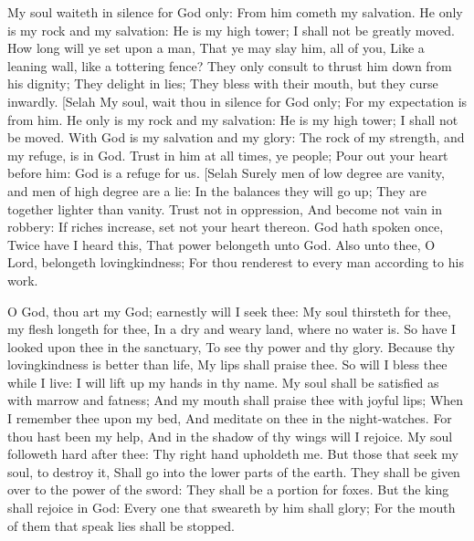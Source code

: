 My soul waiteth in silence for God only: From him cometh my salvation.  He only is my rock and my salvation: He is my high tower; I shall not be greatly moved.  How long will ye set upon a man, That ye may slay him, all of you, Like a leaning wall, like a tottering fence?  They only consult to thrust him down from his dignity; They delight in lies; They bless with their mouth, but they curse inwardly. [Selah  My soul, wait thou in silence for God only; For my expectation is from him.  He only is my rock and my salvation: He is my high tower; I shall not be moved.  With God is my salvation and my glory: The rock of my strength, and my refuge, is in God.  Trust in him at all times, ye people; Pour out your heart before him: God is a refuge for us. [Selah  Surely men of low degree are vanity, and men of high degree are a lie: In the balances they will go up; They are together lighter than vanity.  Trust not in oppression, And become not vain in robbery: If riches increase, set not your heart thereon.  God hath spoken once, Twice have I heard this, That power belongeth unto God.  Also unto thee, O Lord, belongeth lovingkindness; For thou renderest to every man according to his work. 

O God, thou art my God; earnestly will I seek thee: My soul thirsteth for thee, my flesh longeth for thee, In a dry and weary land, where no water is.  So have I looked upon thee in the sanctuary, To see thy power and thy glory.  Because thy lovingkindness is better than life, My lips shall praise thee.  So will I bless thee while I live: I will lift up my hands in thy name.  My soul shall be satisfied as with marrow and fatness; And my mouth shall praise thee with joyful lips;  When I remember thee upon my bed, And meditate on thee in the night-watches.  For thou hast been my help, And in the shadow of thy wings will I rejoice.  My soul followeth hard after thee: Thy right hand upholdeth me.  But those that seek my soul, to destroy it, Shall go into the lower parts of the earth.  They shall be given over to the power of the sword: They shall be a portion for foxes.  But the king shall rejoice in God: Every one that sweareth by him shall glory; For the mouth of them that speak lies shall be stopped. 


